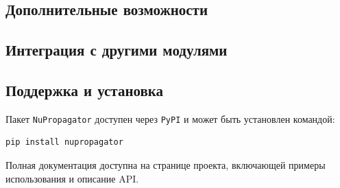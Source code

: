 \subsection{Дополнительные возможности}

\subsection{Интеграция с другими модулями}

\subsection{Поддержка и установка}

Пакет \texttt{NuPropagator} доступен через \texttt{PyPI} и может быть установлен командой:
\begin{verbatim}
pip install nupropagator
\end{verbatim}
Полная документация доступна на странице проекта, включающей примеры использования и описание API.
